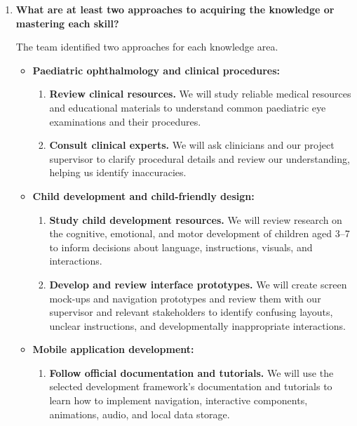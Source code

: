 \documentclass[10pt]{article}
\begin{document}
\begin{enumerate}
    \item \textbf{What are at least two approaches to acquiring the
    knowledge or mastering each skill?}

    The team identified two approaches for each knowledge area.

    \begin{itemize}
        \item \textbf{Paediatric ophthalmology and clinical procedures:}
        \begin{enumerate}
            \item \textbf{Review clinical resources.}
            We will study reliable medical resources and educational
            materials to understand common paediatric eye examinations
            and their procedures.

            \item \textbf{Consult clinical experts.}
            We will ask clinicians and our project supervisor to clarify
            procedural details and review our understanding, helping
            us identify inaccuracies.
        \end{enumerate}

        \item \textbf{Child development and child-friendly design:}
        \begin{enumerate}
            \item \textbf{Study child development resources.}
            We will review research on the cognitive, emotional, and
            motor development of children aged 3--7 to inform decisions
            about language, instructions, visuals, and interactions.

            \item \textbf{Develop and review interface prototypes.}
            We will create screen mock-ups and navigation prototypes
            and review them with our supervisor and relevant stakeholders
            to identify confusing layouts, unclear instructions, and
            developmentally inappropriate interactions.
        \end{enumerate}

        \item \textbf{Mobile application development:}
        \begin{enumerate}
            \item \textbf{Follow official documentation and tutorials.}
            We will use the selected development framework's documentation
            and tutorials to learn how to implement navigation,
            interactive components, animations, audio, and local
            data storage.


\end{enumerate}
\end{itemize}
\end{enumerate}
\end{document}

